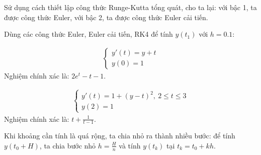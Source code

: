 \documentclass[12pt]{article}
\begin{document}
Sử dụng cách thiết lập công thức Runge-Kutta tổng quát, cho ta lại: với bậc 1, ta được công thức Euler, với bậc 2, ta được công thức Euler cải tiến.

\newpage{}

Dùng các công thức Euler, Euler cải tiến, RK4 để tính $y(t_1)$ với $h=0.1$:

\begin{align}
 \left\lbrace \begin{array}{l}
               y'(t) = y+t \\
               y(0)=1
              \end{array}
\right.
\end{align}
Nghiệm chính xác là: $2 e^t - t - 1$.

\begin{align}
 \left\lbrace \begin{array}{l}
               y'(t) = 1+(y-t)^2, ~ 2 \leq t \leq 3 \\
               y(2)=1
              \end{array}
\right.
\end{align}
Nghiệm chính xác là: $t+\frac{1}{t-1}$.

\newpage{}

Khi khoảng cần tính là quá rộng, ta chia nhỏ ra thành nhiều bước: để tính $y(t_0+H)$, ta chia bước nhỏ $h=\frac{H}{n}$ và tính $y(t_k)$ tại $t_k = t_0 + kh$.

\newpage{}
\end{document}
